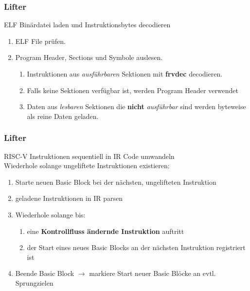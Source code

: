 
\begin{frame}[fragile]
    \frametitle{Lifter}{ELF Binärdatei laden und Instruktionsbytes decodieren}
    \begin{enumerate}
        \setlength\itemsep{0.6em}
        \item ELF File prüfen.
        \item Program Header, Sections und Symbole auslesen.
              \vspace{0.5em}
              \begin{enumerate}
                  \setlength\itemsep{0.6em}
                  \item Instruktionen aus \textit{ausführbaren} Sektionen mit \textbf{frvdec} decodieren.
                  \item Falls keine Sektionen verfügbar ist, werden Program Header verwendet
                  \item Daten aus \textit{lesbaren} Sektionen die \textbf{nicht} \textit{ausführbar} sind werden
                        byteweise als reine Daten geladen.
              \end{enumerate}
    \end{enumerate}
\end{frame}
\clearpage


\begin{frame}
    \frametitle{Lifter}{RISC-V Instruktionen sequentiell in IR Code umwandeln}
    \\\vspace{0.5em}
    Wiederhole solange ungeliftete Instruktionen existieren:
    \begin{enumerate}
        \setlength{\itemsep}{0.8em}
        \item Starte neuen Basic Block bei der nächsten, ungelifteten Instruktion
        \item geladene Instruktionen in IR parsen
        \item Wiederhole solange bis:
              \begin{enumerate}
                  \vspace{1em}
                  \setlength{\itemsep}{1em}
                  \item eine \textbf{Kontrollfluss ändernde Instruktion} auftritt
                  \item der Start eines
                        neues Basic Blocks an der nächsten Instruktion registriert ist
              \end{enumerate}
        \item Beende Basic Block $\rightarrow$ markiere Start neuer Basic Blöcke an evtl. Sprungzielen
    \end{enumerate}
\end{frame}
\clearpage


